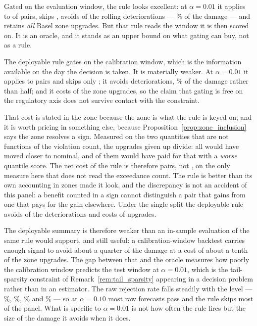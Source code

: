 \documentclass[preprint,11pt,authoryear]{elsarticle}
\newcommand{\1}{\boldsymbol{1}}
\begin{document}
Gated on the evaluation window, the rule looks excellent: at $\alpha = 0.01$ it
applies to \nGateRollOracleApplied{} of \nSeqPairs{} pairs, skips
\nGateRollOracleSkipped, avoids \nGateRollOracleAvoided{} of the
\nDegradedRoll{} rolling deteriorations --- \nGateRollOracleAvoidedPct\% of the
damage --- and retains \emph{all} \nGateRollOracleUpgrades{} Basel zone
upgrades. But that rule reads the window it is then scored on. It is an oracle,
and it stands as an upper bound on what gating can buy, not as a rule.

The deployable rule gates on the calibration window, which is the information
available on the day the decision is taken. It is materially weaker. At
$\alpha = 0.01$ it applies to \nGateRollApplied{} pairs and skips only
\nGateRollSkipped; it avoids \nGateRollAvoided{} deteriorations,
\nGateRollAvoidedPct\% of the damage rather than half; and it costs
\nGateRollUpgradesLost{} of the \nGateRollUpgrades{} zone upgrades, so the claim
that gating is free on the regulatory axis does not survive contact with the
constraint.

That cost is stated in the zone because the zone is what the rule is keyed on,
and it is worth pricing in something else, because Proposition~\ref{prop:zone_inclusion}
says the zone resolves a sign. Measured on the two quantities that are not
functions of the violation count, the \nGateRollUpgradesLost{} upgrades given up
divide: all \nGateRollUpgradesLost{} would have moved closer to nominal, and
\nGateRollUpgradesLostWorse{} of them would have paid for that with a
\emph{worse} quantile score. The net cost of the rule is therefore
\nGateRollUpgradesLostNet{} pairs, not \nGateRollUpgradesLost, on the only
measure here that does not read the exceedance count. The rule is better than
its own accounting in zones made it look, and the discrepancy is not an
accident of this panel: a benefit counted in a sign cannot distinguish a pair
that gains from one that pays for the gain elsewhere. Under the single split the deployable rule avoids
\nGateStaticAvoided{} of the \nDegradedStatic{} deteriorations and costs
\nGateStaticUpgradesLost{} of \nGateStaticUpgrades{} upgrades.

The deployable summary is therefore weaker than an in-sample evaluation of the
same rule would support, and still useful: a calibration-window backtest carries
enough signal to avoid about a quarter of the damage at a cost of about a tenth
of the zone upgrades. The gap between that and the oracle measures how poorly the
calibration window predicts the test window at $\alpha = 0.01$, which is the
tail-sparsity constraint of Remark~\ref{rem:tail_sparsity} appearing in a
decision problem rather than in an estimator. The raw rejection rate falls
steadily with the level --- \nSeqKupiecRejRawOne\%,
\nSeqKupiecRejRawTwoFive\%, \nSeqKupiecRejRawFive\% and \nSeqKupiecRejRawTen\%
--- so at $\alpha = 0.10$ most raw forecasts pass and the rule skips most of the
panel. What is specific to $\alpha = 0.01$ is not how often the rule fires but
the size of the damage it avoids when it does.
\end{document}
